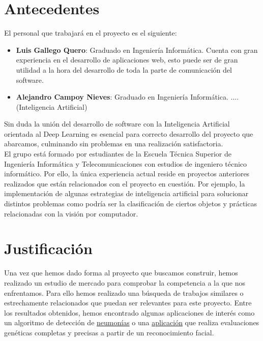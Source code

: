 \documentclass[a4paper,12pt,oneside]{article}
\begin{document}
\section{Antecedentes}

El personal que trabajará en el proyecto es el siguiente:
\begin{itemize}
	\item \textbf{Luis Gallego Quero}: Graduado en Ingeniería Informática. Cuenta con gran experiencia en el desarrollo de aplicaciones web, esto puede ser de gran utilidad a la hora del desarrollo de toda la parte de comunicación del software.
	\item \textbf{Alejandro Campoy Nieves}:  Graduado en Ingeniería Informática. .... (Inteligencia Artificial)
\end{itemize}

Sin duda la unión del desarrollo de software con la Inteligencia Artificial orientada al Deep Learning es esencial para correcto desarrollo del proyecto que abarcamos, culminando sin problemas en una realización satisfactoria. \\

El grupo está formado por estudiantes de la Escuela Técnica Superior de Ingeniería Informática y Telecomunicaciones con estudios de ingeniero técnico informático. Por ello, la única experiencia actual reside en proyectos anteriores realizados que están relacionados con el proyecto en cuestión. Por ejemplo, la implementación de algunas estrategias de inteligencia artificial para solucionar distintos problemas como podría ser la clasificación de ciertos objetos y prácticas relacionadas con la visión por computador.

\section{Justificación}

Una vez que hemos dado forma al proyecto que buscamos construir, hemos realizado un estudio de mercado para comprobar la competencia a la que nos enfrentamos. Para ello hemos realizado una búsqueda de trabajos similares o estrechamente relacionados que puedan ser relevantes para este proyecto. Entre los resultados obtenidos, hemos encontrado algunas aplicaciones de interés como un algoritmo de detección de \href{https://blogthinkbig.com/este-algoritmo-diagnostica-neumonia-con-la-precision-de-un-medico}{neumonías} o una \href{https://www.face2gene.com/}{aplicación} que realiza evaluaciones genéticas completas y precisas a partir de un reconocimiento facial. \\
\end{document}
